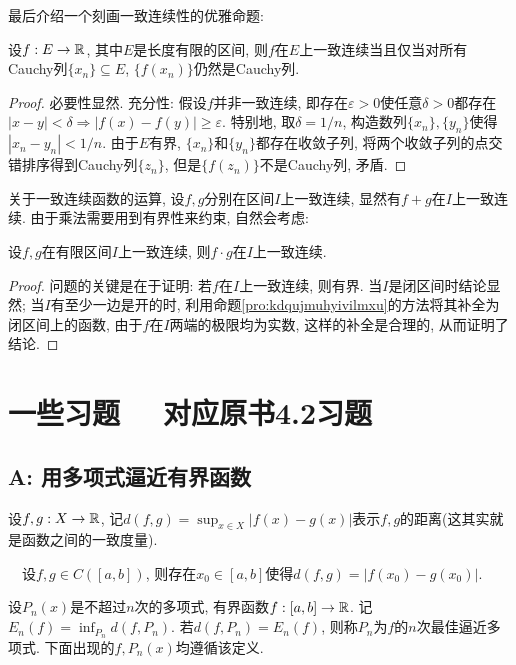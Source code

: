 最后介绍一个刻画一致连续性的优雅命题: 

\begin{proposition}{}
	设$f:E \to \mathbb{R}$, 其中$E$是长度有限的区间, 则$f$在$E$上一致连续当且仅当对所有Cauchy列$\{ x_n \} \subseteq E$, $\{ f(x_n) \}$仍然是Cauchy列. 
\end{proposition}
\begin{proof}
	必要性显然. 充分性: 假设$f$并非一致连续, 即存在$\varepsilon >0$使任意$\delta >0$都存在$|x-y|<\delta \Rightarrow |f(x)-f(y)| \geq \varepsilon$. 特别地, 取$\delta = 1/n$, 构造数列$\{ x_n \},\{ y_n \}$使得$|x_n-y_n|<1/n$. 由于$E$有界, $\{ x_n \}$和$\{ y_n \}$都存在收敛子列, 将两个收敛子列的点交错排序得到Cauchy列$\{ z_n \}$, 但是$\{ f(z_n) \}$不是Cauchy列, 矛盾. 
\end{proof}

关于一致连续函数的运算, 设$f,g$分别在区间$I$上一致连续, 显然有$f+g$在$I$上一致连续. 由于乘法需要用到有界性来约束, 自然会考虑: 

\begin{proposition}{}
	设$f,g$在有限区间$I$上一致连续, 则$f \cdot g$在$I$上一致连续. 
\end{proposition}
\begin{proof}
	问题的关键是在于证明: 若$f$在$I$上一致连续, 则有界. 当$I$是闭区间时结论显然; 当$I$有至少一边是开的时, 利用命题\ref{pro:kdqujmuhyivilmxu}的方法将其补全为闭区间上的函数, 由于$f$在$I$两端的极限均为实数, 这样的补全是合理的, 从而证明了结论. 
\end{proof}

\newpage
\section*{一些习题 ~~\small 对应原书4.2习题} \label{sec:ex4.1}

\subsection*{A: 用多项式逼近有界函数}

设$f,g :X \to \mathbb{R}$, 记$d(f,g) = \sup_{x \in X} | f(x)-g(x) |$表示$f,g$的距离(这其实就是函数之间的一致度量). 
\vspace{1em}

~~设$f,g \in C([a,b])$, 则存在$x_0 \in [a,b]$使得$d(f,g) = |f(x_0)-g(x_0)|$. 
\vspace{1em}

设$P_n(x)$是不超过$n$次的多项式, 有界函数$f:[a,b] \to \mathbb{R}$. 记$E_n(f)= \inf_{P_n} d(f,P_n)$. 若$d(f,P_n) = E_n(f)$, 则称$P_n$为$f$的$n$次最佳逼近多项式. 下面出现的$f,P_n(x)$均遵循该定义. 
\vspace{1em}

